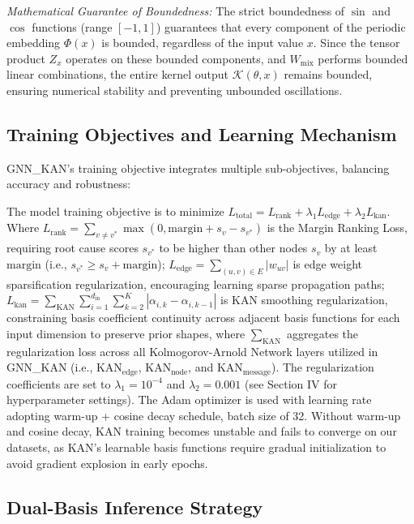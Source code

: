 \documentclass[conference]{IEEEtran}
\begin{document}
\textit{Mathematical Guarantee of Boundedness:} The strict boundedness of $\sin$ and $\cos$ functions (range $[-1, 1]$) guarantees that every component of the periodic embedding $\Phi(x)$ is bounded, regardless of the input value $x$. Since the tensor product $Z_x$ operates on these bounded components, and $W_{\text{mix}}$ performs bounded linear combinations, the entire kernel output $\mathcal{K}(\theta, x)$ remains bounded, ensuring numerical stability and preventing unbounded oscillations.

\subsection{Training Objectives and Learning Mechanism}

GNN\_KAN's training objective integrates multiple sub-objectives, balancing accuracy and robustness:

The model training objective is to minimize $L_{\text{total}} = L_{\text{rank}} + \lambda_1 L_{\text{edge}} + \lambda_2 L_{\text{kan}}$. Where $L_{\text{rank}} = \sum_{v \neq v^*} \max(0, \text{margin} + s_v - s_{v^*})$ is the Margin Ranking Loss, requiring root cause scores $s_{v^*}$ to be higher than other nodes $s_v$ by at least $\text{margin}$ (i.e., $s_{v^*} \geq s_v + \text{margin}$); $L_{\text{edge}} = \sum_{(u,v)\in E} |w_{uv}|$ is edge weight sparsification regularization, encouraging learning sparse propagation paths; $L_{\text{kan}} = \sum_{\text{KAN}} \sum_{i=1}^{d_{\text{in}}} \sum_{k=2}^{K} |\alpha_{i,k} - \alpha_{i,k-1}|$ is KAN smoothing regularization, constraining basis coefficient continuity across adjacent basis functions for each input dimension to preserve prior shapes, where $\sum_{\text{KAN}}$ aggregates the regularization loss across all Kolmogorov-Arnold Network layers utilized in GNN\_KAN (i.e., $\text{KAN}_{\text{edge}}$, $\text{KAN}_{\text{node}}$, and $\text{KAN}_{\text{message}}$). The regularization coefficients are set to $\lambda_1 = 10^{-4}$ and $\lambda_2 = 0.001$ (see Section IV for hyperparameter settings). The Adam optimizer is used with learning rate adopting warm-up + cosine decay schedule, batch size of 32. Without warm-up and cosine decay, KAN training becomes unstable and fails to converge on our datasets, as KAN's learnable basis functions require gradual initialization to avoid gradient explosion in early epochs.

\subsection{Dual-Basis Inference Strategy}
\end{document}
